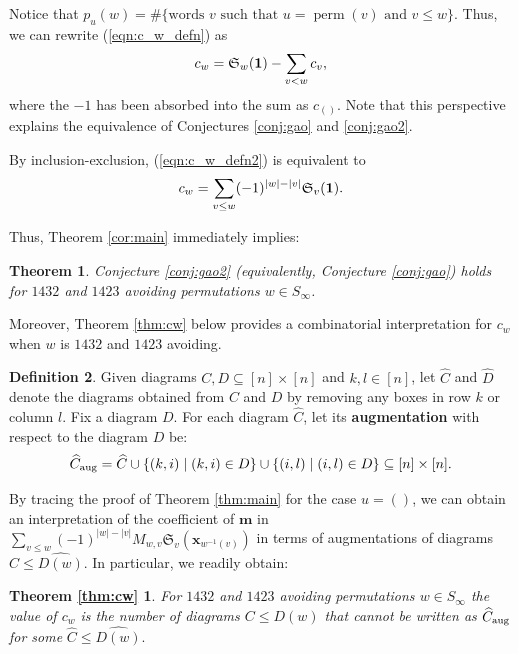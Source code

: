 \documentclass{amsart}
\newtheorem{theorem}{Theorem}[section]
\theoremstyle{definition}
\newtheorem{definition}[theorem]{Definition}
\newtheorem*{theorem2*}{Theorem \ref{thm:cw}}
\theoremstyle{named}
\def\hd{{\widehat{D}}}
\def\hc{{\widehat{C}}}
\newcommand*{\Schub}{\mathfrak{S}}
\DeclareMathOperator*{\perm}{perm}
\begin{document}
Notice that $p_u(w) = \# \{\text{words $v$ such that $u = \perm(v)$ and $v \le w$}\}$. Thus, we can rewrite (\ref{eqn:c_w_defn}) as
\begin{equation} \label{eqn:c_w_defn2}
c_w = \Schub_w({\bf 1}) - \sum_{v < w} c_v,
\end{equation}
where the $-1$ has been absorbed into the sum as $c_{()}$. Note that this perspective explains the equivalence of  Conjectures \ref{conj:gao} and \ref{conj:gao2}.

By inclusion-exclusion, (\ref{eqn:c_w_defn2}) is equivalent to
\begin{equation} \label{eqn:c_w_defn3}
c_w = \sum_{v \le w} (-1)^{\left|w\right|-\left|v\right|} \Schub_v({\bf 1}).
\end{equation}

Thus, Theorem \ref{cor:main} immediately implies:

\begin{theorem} \label{thm:conj} Conjecture \ref{conj:gao2} (equivalently, Conjecture \ref{conj:gao})  holds for $1432$ and $1423$ avoiding permutations  $w \in S_{\infty}$. \end{theorem} 

	Moreover, Theorem \ref{thm:cw} below provides a combinatorial interpretation for $c_w$ when $w$ is $1432$ and $1423$ avoiding. 

\begin{definition}
	Given diagrams $C,D\subseteq [n]\times[n]$ and $k,l\in [n]$, let $\hc$ and  $\hd$ denote the diagrams obtained from $C$ and $D$ by removing any boxes in row $k$ or column $l$. 
	Fix a diagram $D$. For each diagram $\hc$, let its  {\bf augmentation} with respect to the diagram $D$ be:
	\[{\hc}_{\rm aug}=\hc \cup \{(k,i) \mid (k,i)\in D\} \cup \{(i,l) \mid (i,l) \in D \}\subseteq [n]\times [n].\]  
\end{definition}

By tracing the proof of Theorem \ref{thm:main} for the case $u = ()$, we can obtain an interpretation of the coefficient of $\mathbf{m}$ in
$\sum_{v \le w} (-1)^{\left|w\right| - \left|v\right|} M_{w, v}\Schub_v(\mathbf{x}_{w^{-1}(v)})$ in terms of augmentations of diagrams $\widehat{C} \le \widehat{D(w)}$. In particular, we readily obtain:

	\begin{theorem2*}  \textit{For $1432$ and $1423$ avoiding permutations  $w \in S_{\infty}$ the value of $c_w$ is the number of diagrams $C \le D(w)$ that cannot be written as $\widehat{C}_\textup{aug}$ for some} $\widehat{C} \le \widehat{D(w)}$. 
	\end{theorem2*}
\end{document}
